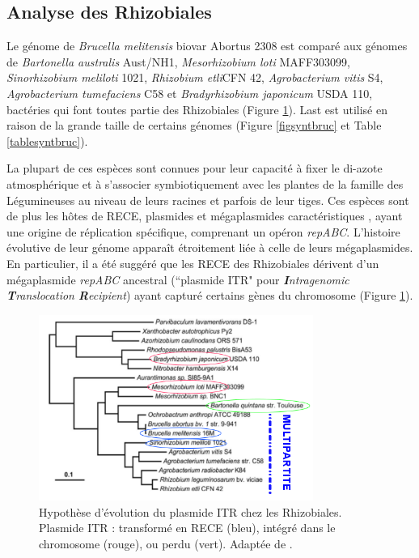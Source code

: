\subsection{Analyse des Rhizobiales}\label{parbruc} 
   Le génome de \textit{Brucella melitensis} biovar Abortus 2308 est comparé aux génomes de \textit{Bartonella australis} Aust/NH1, \textit{Mesorhizobium loti} MAFF303099, \textit{Sinorhizobium meliloti} 1021, \textit{Rhizobium etli}CFN 42, \textit{Agrobacterium vitis} S4, \textit{Agrobacterium tumefaciens} C58 et \textit{Bradyrhizobium japonicum} USDA 110, bactéries qui font toutes partie des Rhizobiales (Figure \ref{figphylrhizo}). Last est utilisé en raison de la grande taille de certains génomes (Figure \ref{figsyntbruc} et Table \ref{tablesyntbruc}).
      
	La plupart de ces espèces sont connues pour leur capacité à fixer le di-azote atmosphérique et à s'associer symbiotiquement avec les plantes de la famille des Légumineuses au niveau de leurs racines et parfois de leur tiges. Ces espèces sont de plus les hôtes de RECE, plasmides et mégaplasmides caractéristiques \citep{Pinto2012}, ayant une origine de réplication spécifique, comprenant un opéron \textit{repABC}. L'histoire évolutive de leur génome apparaît étroitement liée à celle de leurs mégaplasmides. En particulier, il a été suggéré que les RECE des Rhizobiales dérivent d'un mégaplasmide \textit{repABC} ancestral (``plasmide ITR" pour \textit{\textbf{I}ntragenomic \textbf{T}ranslocation \textbf{R}ecipient}) ayant capturé certains gènes du chromosome \citep{Slater2009} (Figure \ref{figphylrhizo}).     

\begin{figure}[h]
	\begin{center}
		\includegraphics[width=0.8\textwidth]{./img/figphylrhizo_3.png}
	\end{center}
	\caption[Hypothèse d'évolution du plasmide ITR chez les Rhizobiales]{Hypothèse d'évolution du plasmide ITR chez les Rhizobiales.\\ Plasmide ITR : transformé en RECE (bleu), intégré dans le chromosome (rouge), ou perdu (vert). Adaptée de \citep{Slater2009}.} \label{figphylrhizo}
\end{figure}

